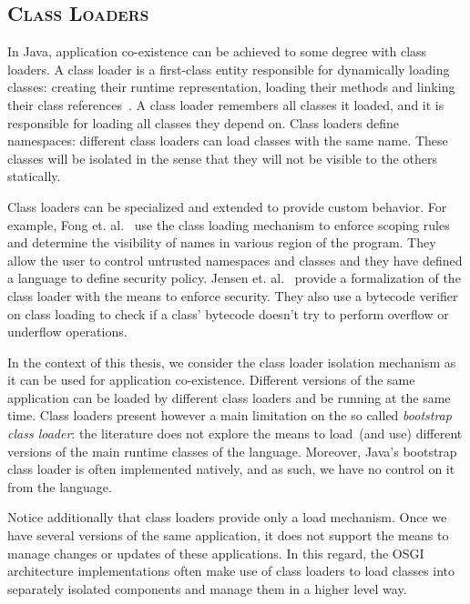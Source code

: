 
\subsection*{\textsc{Class Loaders}}
In Java, application co-existence can be achieved to some degree with class loaders. A class loader is a first-class entity responsible for dynamically loading classes: creating their runtime representation, loading their methods and linking their class references~\cite{Lian98a}. A class loader remembers all classes it loaded, and it is responsible for loading all classes they depend on. Class loaders define namespaces: different class loaders can load classes with the same name. These classes will be isolated in the sense that they will not be visible to the others statically.

Class loaders can be specialized and extended to provide custom behavior. For example, Fong et. al.~\cite{Fong10a} use the class loading mechanism to enforce scoping rules and determine the visibility of names in various region of the program. They allow the user to control untrusted
namespaces and classes and they have defined a language to define security policy. Jensen et. al.~\cite{Jens98a} provide a formalization of the class loader with the means to enforce security. They also use a bytecode verifier on class loading to check if a class' bytecode doesn't try to perform overflow or underflow operations.

In the context of this thesis, we consider the class loader isolation mechanism as it can be used for application co-existence. Different versions of the same application can be loaded by different class loaders and be running at the same time. Class loaders present however a main limitation on the so called \emph{bootstrap class loader}: the literature does not explore the means to load~(and use) different versions of the main runtime classes of the language. Moreover, Java's bootstrap class loader is often implemented natively, and as such, we have no control on it from the language.

Notice additionally that class loaders provide only a load mechanism. Once we have several versions of the same application, it does not support the means to manage changes or updates of these applications. In this regard, the OSGI~\cite{OSGI} architecture implementations often make use of class loaders to load classes into separately isolated components and manage them in a higher level way.

